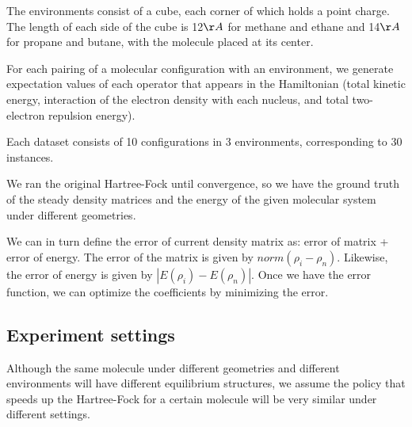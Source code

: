 \documentclass[twoside]{article}
\begin{document}

The environments consist of a cube, each corner of which holds a point charge. The length of each side of the cube is 12$\AA$  for methane and ethane and 14$\AA$  for propane and butane, with the molecule placed at its center. 



For each pairing of a molecular configuration with an environment, we generate expectation values of each operator that appears in the Hamiltonian (total kinetic energy, interaction of the electron density with each nucleus, and total two-electron repulsion energy).

Each dataset consists of 10 configurations in 3 environments, corresponding to 30 instances. %


We ran the original Hartree-Fock until convergence, so we have the ground truth of the steady density matrices and the energy of the given molecular system under different geometries. 

We can in turn define the error of current density matrix as: error of matrix +  error of energy. The error of the matrix is given by $norm(\rho_i-\rho_n)$. Likewise, the error of energy is given by $|E(\rho_i)-E(\rho_n)|$. Once we have the error function, we can optimize the coefficients by minimizing the error.


\subsection{Experiment settings}


Although the same molecule under different geometries and different environments will have different equilibrium structures, we assume the policy that speeds up the Hartree-Fock for a certain molecule will be very similar under different settings. 
\end{document}
